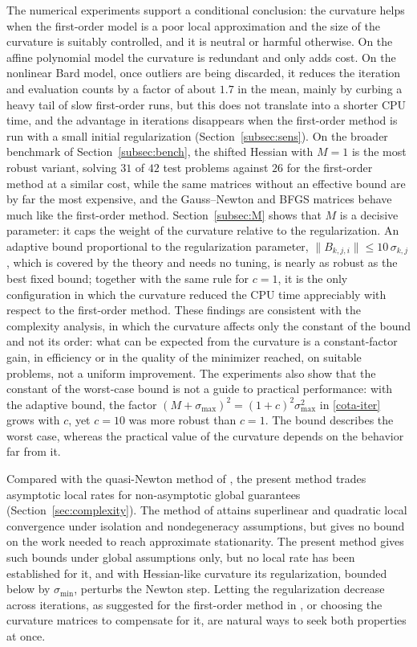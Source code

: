\documentclass[11pt]{article}
\begin{document}
The numerical experiments support a conditional conclusion: the curvature
helps when the first-order model is a poor local approximation and the size of
the curvature is suitably controlled, and it is neutral or harmful otherwise.
On the affine polynomial model the curvature is redundant and only adds cost.
On the nonlinear Bard model, once outliers are being discarded, it reduces the
iteration and evaluation counts by a factor of about $1.7$ in the mean, mainly
by curbing a heavy tail of slow first-order runs, but this does not translate
into a shorter CPU time, and the advantage in iterations disappears when the
first-order method is run with a small initial regularization
(Section~\ref{subsec:sens}). On the broader benchmark of
Section~\ref{subsec:bench}, the shifted Hessian with $M=1$ is the most robust
variant, solving $31$ of $42$ test problems against $26$ for the first-order
method at a similar cost, while the same matrices without an effective bound
are by far the most expensive, and the Gauss--Newton and BFGS matrices behave
much like the first-order method. Section~\ref{subsec:M} shows that $M$ is a
decisive parameter: it caps the weight of the curvature relative to the
regularization. An adaptive bound proportional to the regularization
parameter, $\|B_{k,j,i}\| \le 10\,\sigma_{k,j}$, which is covered by the theory
and needs no tuning, is nearly as robust as the best fixed bound; together
with the same rule for $c = 1$, it is the only configuration in which the
curvature reduced the CPU time appreciably with respect to the first-order
method. These findings are consistent with the complexity analysis, in
which the curvature affects only the constant of the bound and not its order:
what can be expected from the curvature is a constant-factor gain, in
efficiency or in the quality of the minimizer reached, on suitable problems,
not a uniform improvement. The experiments also show that the constant of the
worst-case bound is not a guide to practical performance: with the adaptive
bound, the factor $(M + \sigma_{\max})^2 = (1 + c)^2\sigma_{\max}^2$ in
\eqref{cota-iter} grows with $c$, yet $c = 10$ was more robust than $c = 1$.
The bound describes the worst case, whereas the practical value of the
curvature depends on the behavior far from it.

Compared with the quasi-Newton method of \cite{yano1}, the present method trades
asymptotic local rates for non-asymptotic global guarantees
(Section~\ref{sec:complexity}). The method of \cite{yano1} attains superlinear and
quadratic local convergence under isolation and nondegeneracy assumptions, but
gives no bound on the work needed to reach approximate stationarity. The
present method gives such bounds under global assumptions only, but no local
rate has been established for it, and with Hessian-like curvature its
regularization, bounded below by $\sigma_{\min}$, perturbs the Newton step.
Letting the regularization decrease across iterations, as suggested for the
first-order method in \cite{alvarezovo}, or choosing the curvature matrices to
compensate for it, are natural ways to seek both properties at once.
\end{document}
